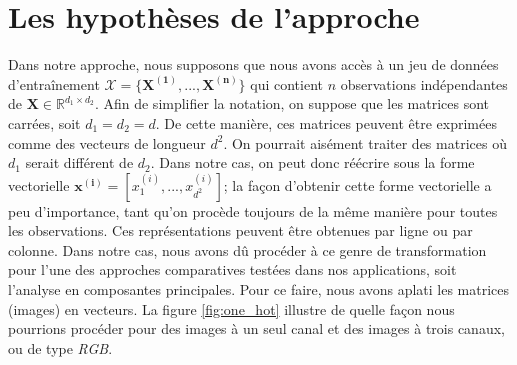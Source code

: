 \section{Les hypothèses de l'approche}

Dans notre approche, nous supposons que  nous avons accès à un jeu de données d'entraînement $\mathcal{X} = \{\boldsymbol{X^{(1)}}, ..., \boldsymbol{X^{(n)}}\}$ qui contient $n$ observations indépendantes de $\mathbf{X} \in \mathbb{R}^{d_1 \times d_2}$. Afin de simplifier la notation, on suppose que les matrices sont carrées, soit $d_1=d_2=d$. De cette manière, ces matrices peuvent être exprimées comme des vecteurs de longueur $d^2$. On pourrait aisément traiter des matrices où $d_1$ serait différent de $d_2$. Dans notre cas, on peut donc réécrire sous la forme vectorielle $\boldsymbol{x^{(i)}} = [x^{(i)}_1,...,x^{(i)}_{d^2}]$; la façon d'obtenir cette forme vectorielle a peu d'importance, tant qu'on procède toujours de la même manière pour toutes les observations. Ces représentations peuvent être obtenues par ligne ou par colonne. Dans notre cas, nous avons dû procéder à ce genre de transformation pour l'une des approches comparatives testées dans nos applications, soit l'analyse en composantes principales. Pour ce faire, nous avons aplati les matrices (images) en vecteurs. La figure \ref{fig:one_hot} illustre de quelle façon nous pourrions procéder pour des images à un seul canal et des images à trois canaux, ou de type \textit{RGB}.

